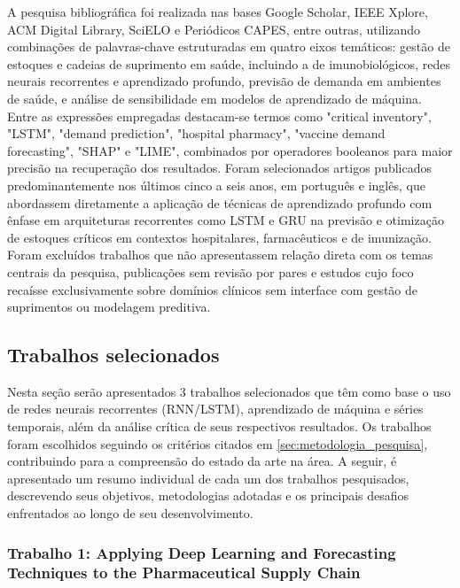 \documentclass[
    12pt,
    openright,
    oneside,
    a4paper,
    english,
    brazil
]{abntex2}
\begin{document}
A pesquisa bibliográfica foi realizada nas bases Google Scholar, IEEE Xplore, ACM Digital Library, SciELO e Periódicos CAPES, entre outras, utilizando combinações de palavras-chave estruturadas em quatro eixos temáticos: gestão de estoques e cadeias de suprimento em saúde, incluindo a de imunobiológicos, redes neurais recorrentes e aprendizado profundo, previsão de demanda em ambientes de saúde, e análise de sensibilidade em modelos de aprendizado de máquina. Entre as expressões empregadas destacam-se termos como "critical inventory", "LSTM", "demand prediction", "hospital pharmacy", "vaccine demand forecasting", "SHAP" e "LIME", combinados por operadores booleanos para maior precisão na recuperação dos resultados. Foram selecionados artigos publicados predominantemente nos últimos cinco a seis anos, em português e inglês, que abordassem diretamente a aplicação de técnicas de aprendizado profundo com ênfase em arquiteturas recorrentes como LSTM e GRU na previsão e otimização de estoques críticos em contextos hospitalares, farmacêuticos e de imunização. Foram excluídos trabalhos que não apresentassem relação direta com os temas centrais da pesquisa, publicações sem revisão por pares e estudos cujo foco recaísse exclusivamente sobre domínios clínicos sem interface com gestão de suprimentos ou modelagem preditiva.

\subsection{Trabalhos selecionados}

Nesta seção serão apresentados 3 trabalhos selecionados que têm como base o uso de redes neurais recorrentes (RNN/LSTM), aprendizado de máquina e séries temporais, além da análise crítica de seus respectivos resultados. Os trabalhos foram escolhidos seguindo os critérios citados em \ref{sec:metodologia_pesquisa}, contribuindo para a compreensão do estado da arte na área. A seguir, é apresentado um resumo individual de cada um dos trabalhos pesquisados, descrevendo seus objetivos, metodologias adotadas e os principais desafios enfrentados ao longo de seu desenvolvimento.

\subsubsection{Trabalho 1: Applying Deep Learning and Forecasting Techniques to the Pharmaceutical Supply Chain}
\end{document}
